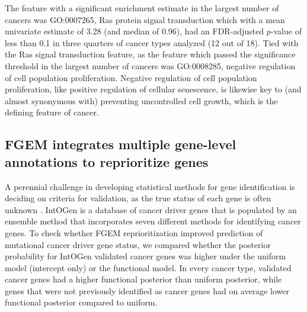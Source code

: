 The feature with a significant enrichment estimate in the largest number of cancers was GO:0007265, Ras protein signal transduction which with a mean univariate estimate of 3.28 (and median of 0.96), had an FDR-adjusted $p$-value of less than 0.1 in three quarters of cancer types analyzed (12 out of 18).  Tied with the Ras signal transduction feature, as the feature which passed the significance threshold in the largest number of cancers was GO:0008285, negative regulation of cell population proliferation.  Negative regulation of cell population proliferation, like positive regulation of cellular senescence, is likewise key to (and almost synonymous with) preventing uncontrolled cell growth, which is the defining feature of cancer.





\subsection{FGEM integrates multiple gene-level annotations to reprioritize genes}\label{sec:orgf0225be}

A perennial challenge in developing statistical methods for gene identification is deciding on criteria for validation, as the true status of each gene is often unknown\cite{Schaid_2018} \cite{drivermaps}.  IntOGen is a database of cancer driver genes that is populated by an ensemble method that incorporates seven different methods for identifying cancer genes. To check whether FGEM reprioritization improved prediction of mutational cancer driver gene status, we compared whether the posterior probability for IntOGen validated cancer genes was higher under the uniform model (intercept only) or the functional model. In every cancer type, validated cancer genes had a higher functional posterior than uniform posterior, while genes that were not previously identified as cancer genes had on average lower functional posterior compared to uniform.



